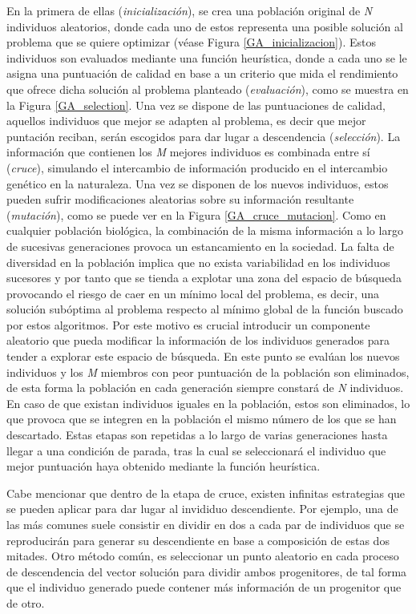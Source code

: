 \documentclass{uathesis-es}
\begin{document}
En la primera de ellas (\textit{inicialización}), se crea una población original de \textit{N} individuos aleatorios, donde cada uno de estos representa una posible solución al problema que se quiere optimizar (véase Figura \ref{GA_inicializacion}). Estos individuos son evaluados mediante una función heurística, donde a cada uno se le asigna una puntuación de calidad en base a un criterio que mida el rendimiento que ofrece dicha solución al problema planteado (\textit{evaluación}), como se muestra en la Figura \ref{GA_selection}. Una vez se dispone de las puntuaciones de calidad, aquellos individuos que mejor se adapten al problema, es decir que mejor puntación reciban, serán escogidos para dar lugar a descendencia (\textit{selección}). La información que contienen los \textit{M} mejores individuos es combinada entre sí (\textit{cruce}), simulando el intercambio de información producido en el intercambio genético en la naturaleza. Una vez se disponen de los nuevos individuos, estos pueden sufrir modificaciones aleatorias sobre su información resultante (\textit{mutación}), como se puede ver en la Figura \ref{GA_cruce_mutacion}. Como en cualquier población biológica, la combinación  de la misma información a lo largo de sucesivas generaciones provoca un estancamiento en la sociedad. La falta de diversidad en la población implica que no exista variabilidad en los individuos sucesores y por tanto que se tienda a explotar una zona del espacio de búsqueda provocando el riesgo de caer en un mínimo local del problema, es decir, una solución subóptima al problema respecto al mínimo global de la función buscado por estos algoritmos. Por este motivo es crucial introducir un componente aleatorio que pueda modificar la información de los individuos generados para tender a explorar este espacio de búsqueda. En este punto se evalúan los nuevos individuos y los \textit{M} miembros con peor puntuación de la población son eliminados, de esta forma la población en cada generación siempre constará de \textit{N} individuos. En caso de que existan individuos iguales en la población, estos son eliminados, lo que provoca que se integren en la población el mismo número de los que se han descartado. Estas etapas son repetidas a lo largo de varias generaciones hasta llegar a una condición de parada, tras la cual se seleccionará el individuo que mejor puntuación haya obtenido mediante la función heurística.

Cabe mencionar que dentro de la etapa de cruce, existen infinitas estrategias que se pueden aplicar para dar lugar al invididuo descendiente. Por ejemplo, una de las más comunes suele consistir en dividir en dos a cada par de individuos que se reproducirán para generar su descendiente en base a composición de estas dos mitades. Otro método común, es seleccionar un punto aleatorio en cada proceso de descendencia del vector solución para dividir ambos progenitores, de tal forma que el individuo generado puede contener más información de un progenitor que de otro.
\end{document}
